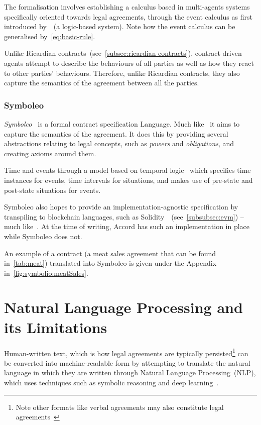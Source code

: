 The formalisation involves establishing a calculus based in multi-agents systems specifically oriented towards legal agreements, through the event calculus as first introduced by~\cite{kowalski1989logicEventBased}~(a logic-based system).
Note how the event calculus can be generalised by~\autoref{eq:basic-rule}.

Unlike Ricardian contracts~(see~\autoref{subsec:ricardian-contracts}), contract-driven agents attempt to describe the behaviours of all parties as well as how they react to other parties' behaviours.
Therefore, unlike Ricardian contracts, they also capture the semantics of the agreement between all the parties.

\subsubsection{Symboleo}\label{subsubsec:symboleo}

\emph{Symboleo}~\cite{symboleo2020} is a formal contract specification Language.
Much like~ it aims to capture the semantics of the agreement.
It does this by providing several abstractions relating to legal concepts, such as \emph{powers} and \emph{obligations}, and creating axioms around them.

Time and events through a model based on temporal logic~\cite{temporalLogic1984} which specifies time instances for events, time intervals for situations, and makes use of pre-state and post-state situations for events.

Symboleo also hopes to provide an implementation-agnostic specification by transpiling to blockchain languages, such as Solidity~\cite{solidity_repo}~(see~\autoref{subsubsec:evm}) -- much like~.
At the time of writing, Accord has such an implementation in place while Symboleo does not.

An example of a contract (a meat sales agreement that can be found in~\autoref{tab:meat}) translated into Symboleo is given under the Appendix in~\autoref{fig:symbolio:meatSales}.


\section{Natural Language Processing and its Limitations}\label{sec:nlp}

Human-written text, which is how legal agreements are typically persisted\footnote{Note other formats like verbal agreements may also constitute legal agreements~\cite{larsonContractLawIntro}} can be converted into machine-readable form by attempting to translate the natural language in which they are written through Natural Language Processing~(NLP), which uses techniques such as symbolic reasoning and deep learning~\cite{GoldbergNLPReview}.


